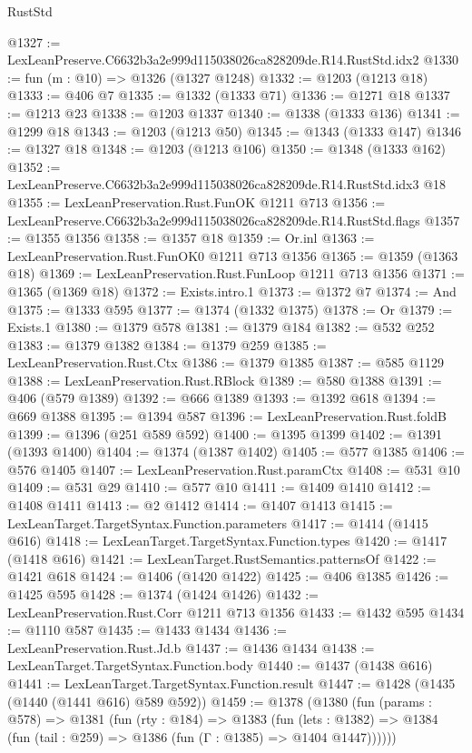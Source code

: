 \begin{lexlean}{RustStd}
\begin{coremodule}
@1327 := LexLeanPreserve.C6632b3a2e999d115038026ca828209de.R14.RustStd.idx2
@1330 := fun (m : @10) => @1326 (@1327 @1248)
@1332 := @1203 (@1213 @18)
@1333 := @406 @7
@1335 := @1332 (@1333 @71)
@1336 := @1271 @18
@1337 := @1213 @23
@1338 := @1203 @1337
@1340 := @1338 (@1333 @136)
@1341 := @1299 @18
@1343 := @1203 (@1213 @50)
@1345 := @1343 (@1333 @147)
@1346 := @1327 @18
@1348 := @1203 (@1213 @106)
@1350 := @1348 (@1333 @162)
@1352 := LexLeanPreserve.C6632b3a2e999d115038026ca828209de.R14.RustStd.idx3 @18
@1355 := LexLeanPreservation.Rust.FunOK @1211 @713
@1356 := LexLeanPreserve.C6632b3a2e999d115038026ca828209de.R14.RustStd.flags
@1357 := @1355 @1356
@1358 := @1357 @18
@1359 := Or.inl
@1363 := LexLeanPreservation.Rust.FunOK0 @1211 @713 @1356
@1365 := @1359 (@1363 @18)
@1369 := LexLeanPreservation.Rust.FunLoop @1211 @713 @1356
@1371 := @1365 (@1369 @18)
@1372 := Exists.intro.{1}
@1373 := @1372 @7
@1374 := And
@1375 := @1333 @595
@1377 := @1374 (@1332 @1375)
@1378 := Or
@1379 := Exists.{1}
@1380 := @1379 @578
@1381 := @1379 @184
@1382 := @532 @252
@1383 := @1379 @1382
@1384 := @1379 @259
@1385 := LexLeanPreservation.Rust.Ctx
@1386 := @1379 @1385
@1387 := @585 @1129
@1388 := LexLeanPreservation.Rust.RBlock
@1389 := @580 @1388
@1391 := @406 (@579 @1389)
@1392 := @666 @1389
@1393 := @1392 @618
@1394 := @669 @1388
@1395 := @1394 @587
@1396 := LexLeanPreservation.Rust.foldB
@1399 := @1396 (@251 @589 @592)
@1400 := @1395 @1399
@1402 := @1391 (@1393 @1400)
@1404 := @1374 (@1387 @1402)
@1405 := @577 @1385
@1406 := @576 @1405
@1407 := LexLeanPreservation.Rust.paramCtx
@1408 := @531 @10
@1409 := @531 @29
@1410 := @577 @10
@1411 := @1409 @1410
@1412 := @1408 @1411
@1413 := @2 @1412
@1414 := @1407 @1413
@1415 := LexLeanTarget.TargetSyntax.Function.parameters
@1417 := @1414 (@1415 @616)
@1418 := LexLeanTarget.TargetSyntax.Function.types
@1420 := @1417 (@1418 @616)
@1421 := LexLeanTarget.RustSemantics.patternsOf
@1422 := @1421 @618
@1424 := @1406 (@1420 @1422)
@1425 := @406 @1385
@1426 := @1425 @595
@1428 := @1374 (@1424 @1426)
@1432 := LexLeanPreservation.Rust.Corr @1211 @713 @1356
@1433 := @1432 @595
@1434 := @1110 @587
@1435 := @1433 @1434
@1436 := LexLeanPreservation.Rust.Jd.b
@1437 := @1436 @1434
@1438 := LexLeanTarget.TargetSyntax.Function.body
@1440 := @1437 (@1438 @616)
@1441 := LexLeanTarget.TargetSyntax.Function.result
@1447 := @1428 (@1435 (@1440 (@1441 @616) @589 @592))
@1459 := @1378
    (@1380
      (fun (params : @578) =>
      @1381
        (fun (rty : @184) =>
        @1383
          (fun (lets : @1382) =>
          @1384 (fun (tail : @259) => @1386 (fun (Γ : @1385) => @1404 @1447))))))

\end{coremodule}
\end{lexlean}
